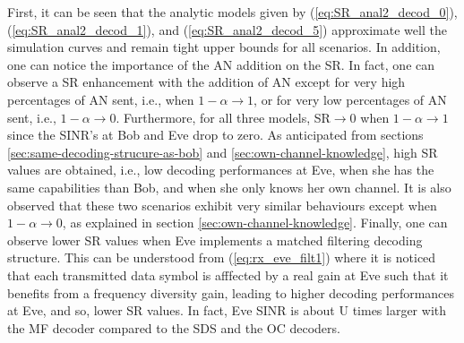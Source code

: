 \documentclass[journal,comsoc]{IEEEtran}
\begin{document}
First, it can be seen that the analytic models given by (\ref{eq:SR_anal2_decod_0}), (\ref{eq:SR_anal2_decod_1}), and (\ref{eq:SR_anal2_decod_5}) approximate well the simulation curves and remain tight upper bounds for all scenarios.  In addition, one can notice the importance of the AN addition on the SR. In fact, one can observe a SR enhancement with the addition of AN except for very high percentages of AN sent, i.e., when $1-\alpha \to 1$, or for very low percentages of AN sent, i.e., $1-\alpha \to 0$. Furthermore, for all three models, SR$\to 0$ when $1-\alpha \to 1$ since the SINR's at Bob and Eve drop to zero. As anticipated from sections \ref{sec:same-decoding-strucure-as-bob} and \ref{sec:own-channel-knowledge}, high SR values are obtained, i.e., low decoding performances at Eve, when she has the same capabilities than Bob, and when she only knows her own channel. It is also observed that these two scenarios exhibit very similar behaviours except when $1-\alpha \to 0$, as explained in section \ref{sec:own-channel-knowledge}. Finally, one can observe lower SR values when Eve implements a matched filtering decoding structure. This can be understood from (\ref{eq:rx_eve_filt1}) where it is  noticed that each transmitted data symbol is afffected by a real gain at Eve such that it benefits from a frequency diversity gain, leading to higher decoding performances at Eve, and so, lower SR values. In fact, Eve SINR is about U times larger with the MF decoder compared to the SDS and the OC decoders.
\end{document}
